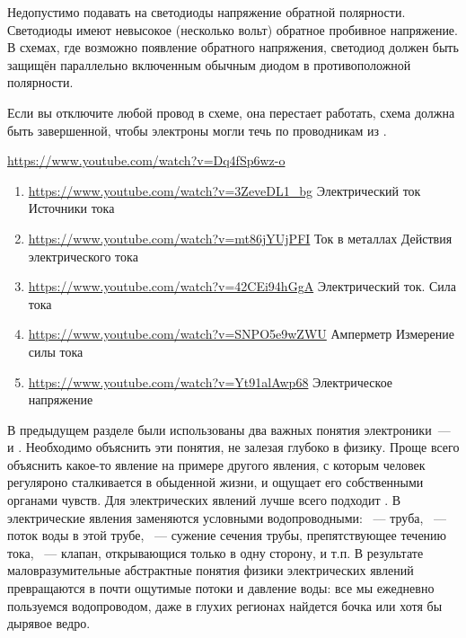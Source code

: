 \bigskip
Недопустимо подавать на светодиоды напряжение обратной полярности. Светодиоды
имеют невысокое (несколько вольт) обратное пробивное напряжение. В схемах, где
возможно появление обратного напряжения, светодиод должен быть защищён
параллельно включенным обычным диодом в противоположной полярности.

\bigskip
Если вы отключите любой провод в схеме, она перестает работать, схема должна
быть завершенной, чтобы электроны могли течь по проводникам из
.

\label{bctok}

\begin{youtube}

\url{https://www.youtube.com/watch?v=Dq4fSp6wz-o}

\begin{enumerate}[nosep]
  \item \url{https://www.youtube.com/watch?v=3ZeveDL1\_bg}
  Электрический ток Источники тока
  \item \url{https://www.youtube.com/watch?v=mt86jYUjPFI}
  Ток в металлах Действия электрического тока 
  \item \url{https://www.youtube.com/watch?v=42CEi94hGgA}
  Электрический ток. Сила тока
  \item \url{https://www.youtube.com/watch?v=SNPO5e9wZWU}
  Амперметр Измерение силы тока
  \item \url{https://www.youtube.com/watch?v=Yt91alAwp68}
  Электрическое напряжение
\end{enumerate}

\end{youtube}

В предыдущем разделе были использованы два важных понятия электроники\ ---
 и . Необходимо объяснить эти
понятия, не залезая глубоко в физику. Проще всего объяснить какое-то явление на
примере другого явления, с которым человек регуляроно сталкивается в обыденной
жизни, и ощущает его собственными органами чувств. Для электрических явлений
лучше всего подходит .
В  электрические явления заменяются условными водопроводными:
\ --- труба, \ --- поток воды в этой трубе,
\ --- сужение сечения трубы, препятствующее течению
тока, \ --- клапан, открывающися только в одну сторону, и
т.п. В результате маловразумительные абстрактные понятия физики электрических
явлений превращаются в почти ощутимые потоки и давление воды: все мы ежедневно
пользуемся водопроводом, даже в глухих регионах найдется бочка или хотя
бы дырявое ведро.


